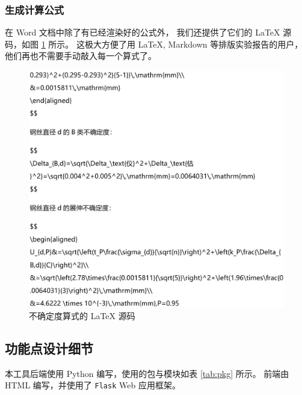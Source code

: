 \subsubsection*{生成计算公式}

在 Word 文档中除了有已经渲染好的公式外，
我们还提供了它们的 \LaTeX{} 源码，如图 \ref{fig:latex} 所示。
这极大方便了用 \LaTeX{}, Markdown 等排版实验报告的用户，他们再也不需要手动敲入每一个算式了。

\begin{figure}[htbp]
  \centering
  \includegraphics[width=\columnwidth]{figure/latex.png}
  \caption{不确定度算式的 \LaTeX{} 源码}
  \label{fig:latex}
\end{figure}

\subsection{功能点设计细节}

本工具后端使用 Python 编写，使用的包与模块如表 \ref{tab:pkg} 所示。
前端由 HTML 编写，并使用了 \verb|Flask| Web 应用框架。

